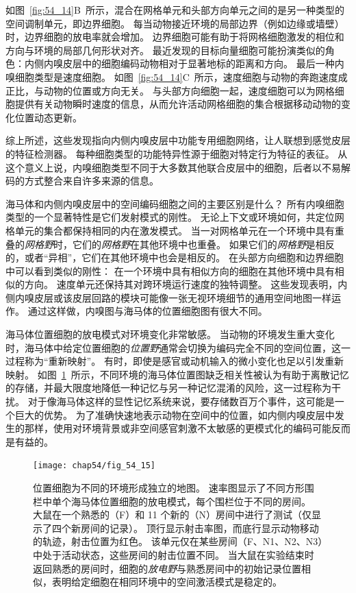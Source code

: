 如图~\ref{fig:54_14}B~所示，混合在网格单元和头部方向单元之间的是另一种类型的空间调制单元，即边界细胞。
每当动物接近环境的局部边界（例如边缘或墙壁）时，边界细胞的放电率就会增加。
边界细胞可能有助于将网格细胞激发的相位和方向与环境的局部几何形状对齐。
最近发现的目标向量细胞可能扮演类似的角色：内侧内嗅皮层中的细胞编码动物相对于显著地标的距离和方向。
最后一种内嗅细胞类型是速度细胞。
如图~\ref{fig:54_14}C~所示，速度细胞与动物的奔跑速度成正比，与动物的位置或方向无关。
与头部方向细胞一起，速度细胞可以为网格细胞提供有关动物瞬时速度的信息，从而允许活动网格细胞的集合根据移动动物的变化位置动态更新。


综上所述，这些发现指向内侧内嗅皮层中功能专用细胞网络，让人联想到感觉皮层的特征检测器。
每种细胞类型的功能特异性源于细胞对特定行为特征的表征。
从这个意义上说，内嗅细胞类型不同于大多数其他联合皮层中的细胞，后者以不易解码的方式整合来自许多来源的信息。


海马体和内侧内嗅皮层中的空间编码细胞之间的主要区别是什么？
所有内嗅细胞类型的一个显著特性是它们发射模式的刚性。
无论上下文或环境如何，共定位网格单元的集合都保持相同的内在激发模式。
当一对网格单元在一个环境中具有重叠的\textit{网格野}时，它们的\textit{网格野}在其他环境中也重叠。
如果它们的\textit{网格野}是相反的，或者“异相”，它们在其他环境中也会是相反的。
在头部方向细胞和边界细胞中可以看到类似的刚性：
在一个环境中具有相似方向的细胞在其他环境中具有相似的方向。
速度单元还保持其对跨环境运行速度的独特调整。
这些发现表明，内侧内嗅皮层或该皮层回路的模块可能像一张无视环境细节的通用空间地图一样运作。
通过这样做，内嗅图与海马体的位置细胞图有很大不同。


海马体位置细胞的放电模式对环境变化非常敏感。
当动物的环境发生重大变化时，海马体中给定位置细胞的\textit{位置野}通常会切换为编码完全不同的空间位置，这一过程称为“重新映射”。
有时，即使是感官或动机输入的微小变化也足以引发重新映射。
如图~\ref{fig:54_15}~所示，不同环境的海马体位置图缺乏相关性被认为有助于离散记忆的存储，并最大限度地降低一种记忆与另一种记忆混淆的风险，这一过程称为干扰。
对于像海马体这样的显性记忆系统来说，要存储数百万个事件，这可能是一个巨大的优势。
为了准确快速地表示动物在空间中的位置，如内侧内嗅皮层中发生的那样，使用对环境背景或非空间感官刺激不太敏感的更模式化的编码可能反而是有益的。


\begin{figure}[htbp]
	\centering
	\texttt{[image: chap54/fig\_54\_15]}
	\caption{位置细胞为不同的环境形成独立的地图。
		速率图显示了不同方形围栏中单个海马体位置细胞的放电模式，每个围栏位于不同的房间。
		大鼠在一个熟悉的（F）和 11 个新的（N）房间中进行了测试（仅显示了四个新房间的记录）。
		顶行显示射击率图，而底行显示动物移动的轨迹，射击位置为红色。
		该单元仅在某些房间（F、N1、N2、N3）中处于活动状态，这些房间的射击位置不同。
		当大鼠在实验结束时返回熟悉的房间时，细胞的\textit{放电野}与熟悉房间中的初始记录位置相似，表明给定细胞在相同环境中的空间激活模式是稳定的\cite{alme2014place}。}
	\label{fig:54_15}
\end{figure}



